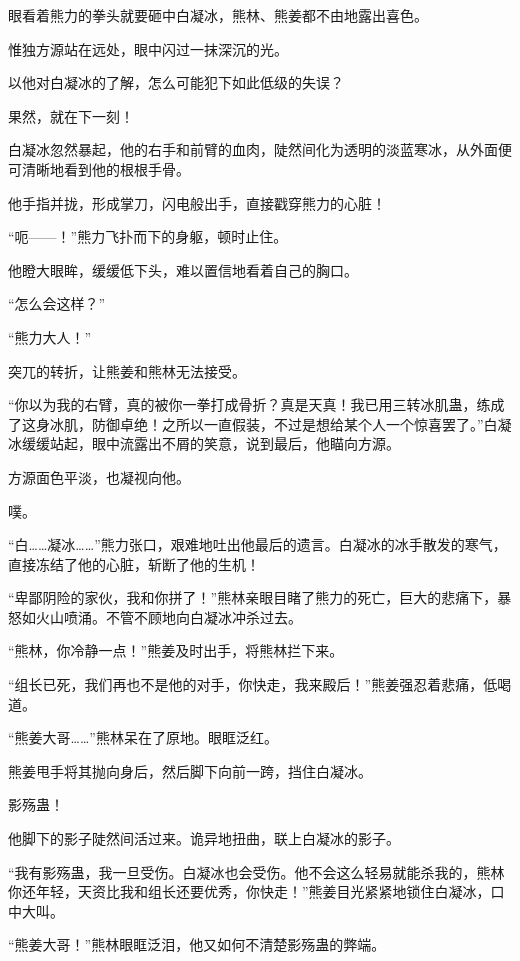 
\begin{this_body}

眼看着熊力的拳头就要砸中白凝冰，熊林、熊姜都不由地露出喜色。

惟独方源站在远处，眼中闪过一抹深沉的光。

以他对白凝冰的了解，怎么可能犯下如此低级的失误？

果然，就在下一刻！

白凝冰忽然暴起，他的右手和前臂的血肉，陡然间化为透明的淡蓝寒冰，从外面便可清晰地看到他的根根手骨。

他手指并拢，形成掌刀，闪电般出手，直接戳穿熊力的心脏！

“呃——！”熊力飞扑而下的身躯，顿时止住。

他瞪大眼眸，缓缓低下头，难以置信地看着自己的胸口。

“怎么会这样？”

“熊力大人！”

突兀的转折，让熊姜和熊林无法接受。

“你以为我的右臂，真的被你一拳打成骨折？真是天真！我已用三转冰肌蛊，练成了这身冰肌，防御卓绝！之所以一直假装，不过是想给某个人一个惊喜罢了。”白凝冰缓缓站起，眼中流露出不屑的笑意，说到最后，他瞄向方源。

方源面色平淡，也凝视向他。

噗。

“白……凝冰……”熊力张口，艰难地吐出他最后的遗言。白凝冰的冰手散发的寒气，直接冻结了他的心脏，斩断了他的生机！

“卑鄙阴险的家伙，我和你拼了！”熊林亲眼目睹了熊力的死亡，巨大的悲痛下，暴怒如火山喷涌。不管不顾地向白凝冰冲杀过去。

“熊林，你冷静一点！”熊姜及时出手，将熊林拦下来。

“组长已死，我们再也不是他的对手，你快走，我来殿后！”熊姜强忍着悲痛，低喝道。

“熊姜大哥……”熊林呆在了原地。眼眶泛红。

熊姜甩手将其抛向身后，然后脚下向前一跨，挡住白凝冰。

影殇蛊！

他脚下的影子陡然间活过来。诡异地扭曲，联上白凝冰的影子。

“我有影殇蛊，我一旦受伤。白凝冰也会受伤。他不会这么轻易就能杀我的，熊林你还年轻，天资比我和组长还要优秀，你快走！”熊姜目光紧紧地锁住白凝冰，口中大叫。

“熊姜大哥！”熊林眼眶泛泪，他又如何不清楚影殇蛊的弊端。


\end{this_body}
